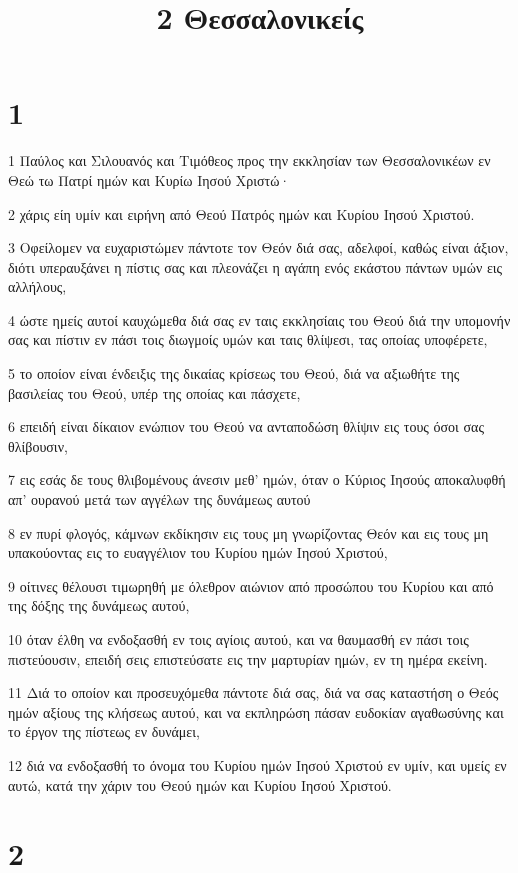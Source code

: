 

\title{2 Θεσσαλονικείς}


\chapter{1}

\par 1 Παύλος και Σιλουανός και Τιμόθεος προς την εκκλησίαν των Θεσσαλονικέων εν Θεώ τω Πατρί ημών και Κυρίω Ιησού Χριστώ·
\par 2 χάρις είη υμίν και ειρήνη από Θεού Πατρός ημών και Κυρίου Ιησού Χριστού.
\par 3 Οφείλομεν να ευχαριστώμεν πάντοτε τον Θεόν διά σας, αδελφοί, καθώς είναι άξιον, διότι υπεραυξάνει η πίστις σας και πλεονάζει η αγάπη ενός εκάστου πάντων υμών εις αλλήλους,
\par 4 ώστε ημείς αυτοί καυχώμεθα διά σας εν ταις εκκλησίαις του Θεού διά την υπομονήν σας και πίστιν εν πάσι τοις διωγμοίς υμών και ταις θλίψεσι, τας οποίας υποφέρετε,
\par 5 το οποίον είναι ένδειξις της δικαίας κρίσεως του Θεού, διά να αξιωθήτε της βασιλείας του Θεού, υπέρ της οποίας και πάσχετε,
\par 6 επειδή είναι δίκαιον ενώπιον του Θεού να ανταποδώση θλίψιν εις τους όσοι σας θλίβουσιν,
\par 7 εις εσάς δε τους θλιβομένους άνεσιν μεθ' ημών, όταν ο Κύριος Ιησούς αποκαλυφθή απ' ουρανού μετά των αγγέλων της δυνάμεως αυτού
\par 8 εν πυρί φλογός, κάμνων εκδίκησιν εις τους μη γνωρίζοντας Θεόν και εις τους μη υπακούοντας εις το ευαγγέλιον του Κυρίου ημών Ιησού Χριστού,
\par 9 οίτινες θέλουσι τιμωρηθή με όλεθρον αιώνιον από προσώπου του Κυρίου και από της δόξης της δυνάμεως αυτού,
\par 10 όταν έλθη να ενδοξασθή εν τοις αγίοις αυτού, και να θαυμασθή εν πάσι τοις πιστεύουσιν, επειδή σεις επιστεύσατε εις την μαρτυρίαν ημών, εν τη ημέρα εκείνη.
\par 11 Διά το οποίον και προσευχόμεθα πάντοτε διά σας, διά να σας καταστήση ο Θεός ημών αξίους της κλήσεως αυτού, και να εκπληρώση πάσαν ευδοκίαν αγαθωσύνης και το έργον της πίστεως εν δυνάμει,
\par 12 διά να ενδοξασθή το όνομα του Κυρίου ημών Ιησού Χριστού εν υμίν, και υμείς εν αυτώ, κατά την χάριν του Θεού ημών και Κυρίου Ιησού Χριστού.

\chapter{2}

